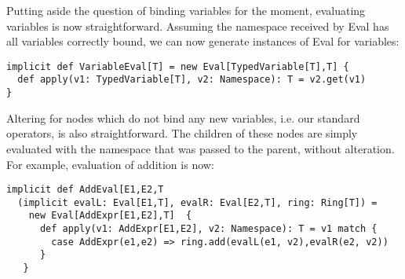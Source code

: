 Putting aside the question of binding variables for the moment, evaluating variables is now straightforward. Assuming the namespace received by Eval has all variables correctly bound, we can now generate instances of Eval for variables:
\vs\begin{lstlisting}
implicit def VariableEval[T] = new Eval[TypedVariable[T],T] {
  def apply(v1: TypedVariable[T], v2: Namespace): T = v2.get(v1)
}
\end{lstlisting}\vs
Altering  for nodes which do not bind any new variables, i.e. our standard operators, is also straightforward. The children of these nodes are simply evaluated with the namespace that was passed to the parent, without alteration. For example, evaluation of addition is now:
\vs\begin{lstlisting}
implicit def AddEval[E1,E2,T
  (implicit evalL: Eval[E1,T], evalR: Eval[E2,T], ring: Ring[T]) =
    new Eval[AddExpr[E1,E2],T]  {
      def apply(v1: AddExpr[E1,E2], v2: Namespace): T = v1 match {
        case AddExpr(e1,e2) => ring.add(evalL(e1, v2),evalR(e2, v2))
      }
   }
\end{lstlisting}\vs

